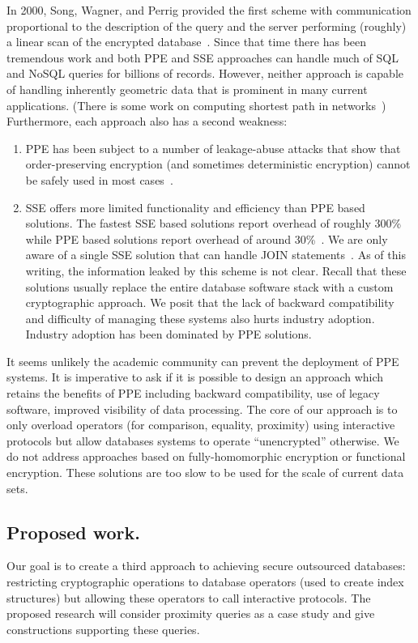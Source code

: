 In 2000, Song, Wagner, and Perrig provided the first scheme with communication proportional to the description of the query and the server performing (roughly) a linear scan of the encrypted database~\cite{SP:SonWagPer00}.  Since that time there has been tremendous work and both PPE and SSE approaches can handle much of SQL and NoSQL queries for billions of records.  However, neither approach is capable of handling inherently geometric data that is prominent in many current applications. (There is some work on computing shortest path in networks~\cite{CCS:MKNK15})  Furthermore, each approach also has a second weakness:
\begin{enumerate}
\item PPE has been subject to a number of leakage-abuse attacks that show that order-preserving encryption (and sometimes deterministic encryption) cannot be safely used in most cases~\cite{CCS:NavKamWri15,CCS:CGPR15,CCS:KKNO16,CCS:PouWri16,CCS:GMNRS16,EPRINT:GSBNR16,EPRINT:ZhaKatPap16}.
\item SSE offers more limited functionality and efficiency than PPE based solutions.  The fastest SSE based solutions report overhead of roughly 300\%~\cite{C:CJJKRS13,CCS:JJKRS13,NDSS:CJJJKR14,ESORICS:FJKNRS15} while PPE based solutions report overhead of around 30\%~\cite{CACM:PRZB12}.  We are only aware of a single SSE solution that can handle JOIN statements~\cite{EPRINT:KamMoa16}.  As of this writing, the information  leaked by this scheme is not clear.  Recall that these solutions usually replace the entire database software stack with a custom cryptographic approach.  We posit that the lack of backward compatibility and difficulty of managing these systems also hurts industry adoption.  Industry adoption has been dominated by PPE solutions.
\end{enumerate}

It seems unlikely the academic community can prevent the deployment of PPE systems.  It is imperative to ask if it is possible to design an approach which retains the benefits of PPE including backward compatibility, use of legacy software, improved visibility of data processing.  The core of our approach is to only overload operators (for comparison, equality, proximity) using interactive protocols but allow databases systems to operate ``unencrypted'' otherwise.  
We do not address approaches based on fully-homomorphic encryption or functional encryption.  These solutions are too slow to be used for the scale of current data sets.


\subsection{Proposed work.}
Our goal is to create a third approach to achieving secure outsourced databases: restricting cryptographic operations to database operators (used to create index structures) but allowing these operators to call interactive protocols. The proposed research will
consider proximity queries as a case study and give constructions supporting
these queries. 

